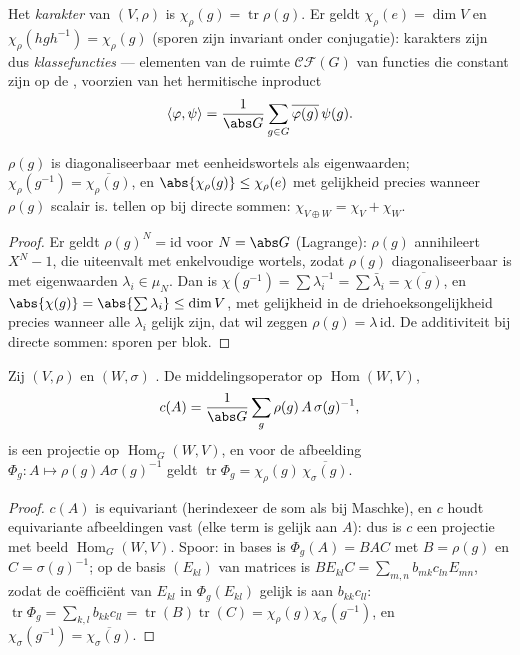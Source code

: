 \begin{definition}\label{def:b3:representations:character}
Het \emph{karakter} van $(V, \rho)$ is
$\chi_\rho(g) = \operatorname{tr}\rho(g)$. Er geldt $\chi_\rho(e)
= \dim V$ en $\chi_\rho(hgh^{-1}) = \chi_\rho(g)$ (sporen zijn
invariant onder conjugatie): karakters zijn dus
\emph{klassefuncties} --- elementen van de
ruimte $\mathcal{CF}(G)$ van functies die constant zijn op de
, voorzien van het hermitische inproduct
\[
\langle \varphi, \psi\rangle = \frac1{\abs G}\sum_{g \in G}
\overline{\varphi(g)}\,\psi(g).
\]
\end{definition}

\begin{proposition}\label{prop:b3:representations:charbasics}
$\rho(g)$ is diagonaliseerbaar met eenheidswortels als
eigenwaarden; $\chi_\rho(g^{-1}) = \overline{\chi_\rho(g)}$, en
$\abs{\chi_\rho(g)} \leq \chi_\rho(e)$ met gelijkheid precies
wanneer $\rho(g)$ scalair is.  tellen op bij directe
sommen: $\chi_{V \oplus W} = \chi_V + \chi_W$.
\end{proposition}

\begin{proof}
Er geldt $\rho(g)^N = \mathrm{id}$ voor $N = \abs G$ (Lagrange):
$\rho(g)$ annihileert $X^N - 1$, die uiteenvalt met enkelvoudige
wortels, zodat $\rho(g)$ diagonaliseerbaar is met eigenwaarden
$\lambda_i \in \mu_N$. Dan is $\chi(g^{-1}) = \sum \lambda_i^{-1}
= \sum\bar\lambda_i = \overline{\chi(g)}$, en $\abs{\chi(g)} =
\abs{\sum\lambda_i} \leq \dim V$, met gelijkheid in de
driehoeksongelijkheid precies wanneer alle $\lambda_i$ gelijk
zijn, dat wil zeggen $\rho(g) = \lambda\,\mathrm{id}$. De
additiviteit bij directe sommen: sporen per blok.
\end{proof}

\begin{lemma}\label{lem:b3:representations:homtrace}
Zij $(V, \rho)$ en $(W, \sigma)$ . De
middelingsoperator op $\operatorname{Hom}(W, V)$,
\[
c(A) = \frac1{\abs G}\sum_{g}\rho(g)\,A\,\sigma(g)^{-1},
\]
is een projectie op $\operatorname{Hom}_G(W, V)$, en voor de
afbeelding $\Phi_g \colon A \mapsto \rho(g)A\sigma(g)^{-1}$ geldt
$\operatorname{tr}\Phi_g =
\chi_\rho(g)\,\overline{\chi_\sigma(g)}$.
\end{lemma}

\begin{proof}
$c(A)$ is equivariant (herindexeer de som als bij Maschke), en $c$
houdt equivariante afbeeldingen vast (elke term is gelijk aan
$A$): dus is $c$ een projectie met beeld $\operatorname{Hom}_G(W,
V)$. Spoor: in bases is $\Phi_g(A) = BAC$ met $B = \rho(g)$ en $C
= \sigma(g)^{-1}$; op de basis $(E_{kl})$ van matrices is
$BE_{kl}C = \sum_{m,n} b_{mk}c_{ln}E_{mn}$, zodat de coëfficiënt
van $E_{kl}$ in $\Phi_g(E_{kl})$ gelijk is aan $b_{kk}c_{ll}$:
$\operatorname{tr}\Phi_g = \sum_{k,l}b_{kk}c_{ll} =
\operatorname{tr}(B) \operatorname{tr}(C) =
\chi_\rho(g)\chi_\sigma(g^{-1})$, en $\chi_\sigma(g^{-1}) =
\overline{\chi_\sigma(g)}$.
\end{proof}

